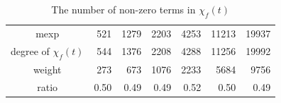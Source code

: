 \documentclass{svmult}
\def\bbf2{\ifmmode\mathbb{F}_2\else$\mathbb{F}_2$\fi}%
\begin{document}
\begin{table}[ht]
  \begin{center}
    \caption{The number of non-zero terms in $\chi_f(t)$}
    \label{tab:weight}
    \begin{tabular}{c|rrrrrr} \hline
      mexp & 521 & 1279 & 2203 & 4253 & 11213 & 19937 \\
      degree of $\chi_f(t)$ & 544 & 1376 & 2208 & 4288 & 11256 & 19992 \\
      weight & 273 & 673 & 1076 & 2233 & 5684 & 9756 \\ 
      ratio & 0.50 & 0.49 & 0.49 & 0.52 & 0.50 & 0.49 \\ \hline
    \end{tabular}
  \end{center}
\end{table}

\end{document}
